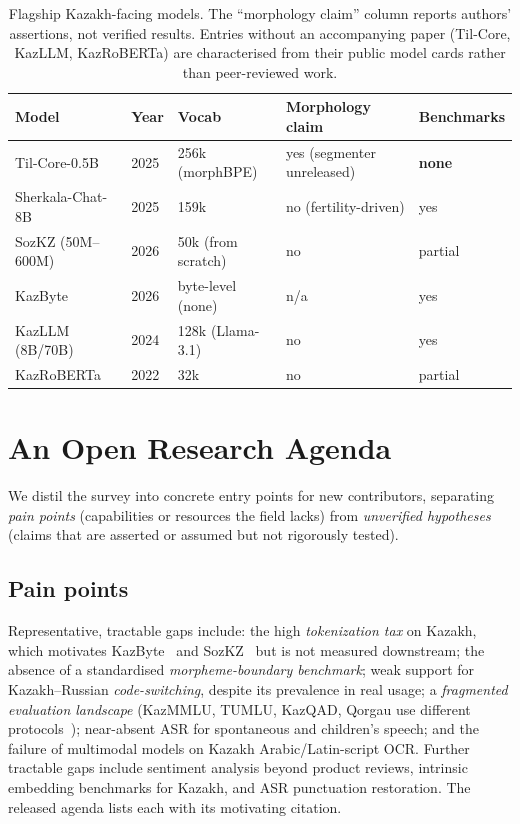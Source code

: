 \documentclass{article}
\begin{document}
\begin{table}[t]
  \centering
  \small
  \begin{tabular}{lllll}
    \toprule
    \textbf{Model} & \textbf{Year} & \textbf{Vocab} & \textbf{Morphology claim} & \textbf{Benchmarks} \\
    \midrule
    Til-Core-0.5B   & 2025 & 256k (morphBPE) & yes (segmenter unreleased) & \textbf{none} \\
    Sherkala-Chat-8B & 2025 & 159k & no (fertility-driven) & yes \\
    SozKZ (50M--600M) & 2026 & 50k (from scratch) & no & partial \\
    KazByte          & 2026 & byte-level (none) & n/a & yes \\
    KazLLM (8B/70B)  & 2024 & 128k (Llama-3.1) & no & yes \\
    KazRoBERTa       & 2022 & 32k & no & partial \\
    \bottomrule
  \end{tabular}
  \caption{Flagship Kazakh-facing models. The ``morphology claim'' column reports authors'
  assertions, not verified results. Entries without an accompanying paper (Til-Core, KazLLM,
  KazRoBERTa) are characterised from their public model cards rather than peer-reviewed work.}
  \label{tab:models}
\end{table}

\section{An Open Research Agenda}
\label{sec:agenda}
We distil the survey into concrete entry points for new contributors, separating
\emph{pain points} (capabilities or resources the field lacks) from \emph{unverified
hypotheses} (claims that are asserted or assumed but not rigorously tested).

\subsection{Pain points}
Representative, tractable gaps include: the high \emph{tokenization tax} on Kazakh, which
motivates KazByte~\cite{kazbyte} and SozKZ~\cite{sozkz} but is not measured downstream;
the absence of a standardised \emph{morpheme-boundary benchmark}; weak support for
Kazakh--Russian \emph{code-switching}, despite its prevalence in real usage; a
\emph{fragmented evaluation landscape} (KazMMLU, TUMLU, KazQAD, Qorgau use different
protocols~\cite{kazmmlu,tumlu,kazqad,qorgau}); near-absent ASR for spontaneous and
children's speech; and the failure of multimodal models on Kazakh Arabic/Latin-script OCR.
Further tractable gaps include sentiment analysis beyond product reviews, intrinsic
embedding benchmarks for Kazakh, and ASR punctuation restoration. The released agenda lists
each with its motivating citation.
\end{document}

